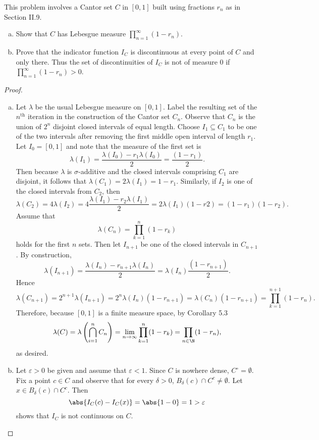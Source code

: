 \documentclass[12pt]{amsart}
\begin{document}
\setcounter{thm}{10}
\begin{thm}
  This problem involves a Cantor set $C$ in $[0,1]$ built using fractions $r_n$ as in Section II.9.
  \begin{enumerate}[(a)]
  \item
    Show that $C$ has Lebesgue measure $\prod_{n = 1}^\infty (1 - r_n)$.
  \item
    Prove that the indicator function $I_C$ is discontinuous at every point of $C$ and only there.
    Thus the set of discontinuities of $I_C$ is not of measure 0 if $\prod_{n = 1}^\infty (1 - r_n) > 0$.
  \end{enumerate}
  
  \begin{proof}
    \begin{enumerate}[(a)]
    \item
      Let $\lambda$ be the usual Lebesgue measure on $[0,1]$.
      Label the resulting set of the $n^\text{th}$ iteration in the construction of the Cantor set $C_n$.
      Observe that $C_n$ is the union of $2^{n}$ disjoint closed intervals of equal length.
      Choose $I_1 \subseteq C_1$ to be one of the two intervals after removing the first middle open interval of length $r_1$.
      Let $I_0 = [0,1]$ and note that the measure of the first set is 
      $$\lambda(I_1) = \frac{\lambda(I_0) - r_1\lambda(I_0)}{2} = \frac{(1 - r_1)}{2}.$$
      Then because $\lambda$ is $\sigma$-additive and the closed intervals comprising $C_1$ are disjoint, it follows that $\lambda(C_1) = 2\lambda(I_1) = 1 - r_1$.
      Similarly, if $I_2$ is one of the closed intervals from $C_2$, then 
      $$\lambda(C_2) = 4\lambda(I_2) = 4\frac{\lambda(I_1) - r_2\lambda(I_1)}{2} = 2\lambda(I_1)(1 - r2) = (1 - r_1)(1 - r_2).$$
      Assume that 
      $$\lambda(C_n) = \prod_{k = 1}^n(1 - r_k)$$
      holds for the first $n$ sets.
      Then let $I_{n+1}$ be one of the closed intervals in $C_{n+1}$.
      By construction, $$\lambda(I_{n+1}) = \frac{\lambda(I_n) - r_{n+1}\lambda(I_n)}{2} = \lambda(I_n)\frac{(1 - r_{n+1})}{2}.$$
      Hence $$\lambda(C_{n+1}) = 2^{n+1}\lambda(I_{n+1}) = 2^{n}\lambda(I_n)(1 - r_{n+1}) = \lambda(C_n)(1 - r_{n+1}) = \prod_{k = 1}^{n+1}(1 - r_n).$$
      Therefore, because $[0,1]$ is a finite measure space, by Corollary 5.3
      $$\lambda(C) = \lambda\left(\bigcap_{i = 1}^n C_n\right) = \lim_{n \rightarrow \infty} \prod_{k = 1}^n (1 - r_k) = \prod_{n \in \N} (1 - r_n),$$
      as desired.
    \item
      Let $\varepsilon > 0$ be given and assume that $\varepsilon < 1$.
      Since $C$ is nowhere dense, $C^\circ = \emptyset$. 
      Fix a point $c \in C$ and observe that for every $\delta > 0$, $B_\delta(c) \cap C^c \neq \emptyset$.
      Let $x \in B_\delta(c) \cap C^c$.
      Then 
      $$\abs{I_C(c) - I_C(x)} = \abs{1 - 0} = 1 > \varepsilon$$
      shows that $I_C$ is not continuous on $C$.
      

\end{enumerate}
\end{proof}
\end{thm}
\end{document}
